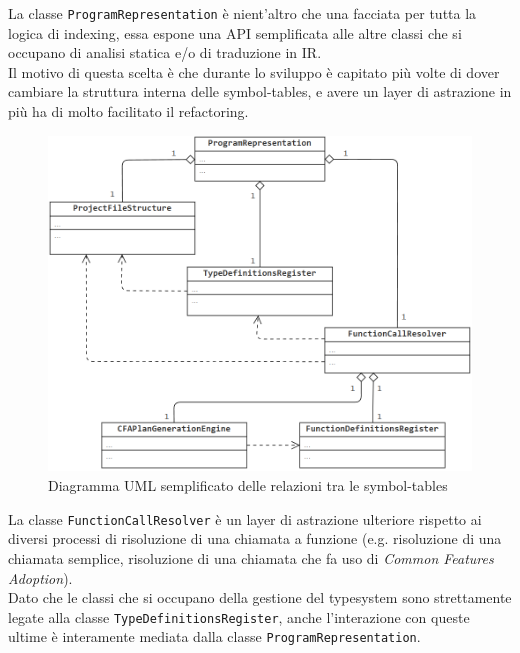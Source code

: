 \newpage

La classe \texttt{ProgramRepresentation} è nient'altro che una facciata per tutta la logica di indexing, essa 
espone una API semplificata alle altre classi che si occupano di analisi statica e/o di traduzione in IR. \\

Il motivo di questa scelta è che durante lo sviluppo è capitato più volte di dover cambiare la struttura interna
delle symbol-tables, e avere un layer di astrazione in più ha di molto facilitato il refactoring. \\

\begin{figure}[h]
    \centering
        \includegraphics[width=1\textwidth]{../../Assets/OverviewIndexing.png}
    \caption{Diagramma UML semplificato delle relazioni tra le symbol-tables}
\end{figure}
\vspace{0.5cm}

La classe \texttt{FunctionCallResolver} è un layer di astrazione ulteriore rispetto ai diversi processi di risoluzione 
di una chiamata a funzione (e.g. risoluzione di una chiamata semplice, risoluzione di una chiamata che fa uso di \textit{Common Features Adoption}). \\

Dato che le classi che si occupano della gestione del typesystem sono strettamente legate alla classe \texttt{TypeDefinitionsRegister},
anche l'interazione con queste ultime è interamente mediata dalla classe \texttt{ProgramRepresentation}. \\
